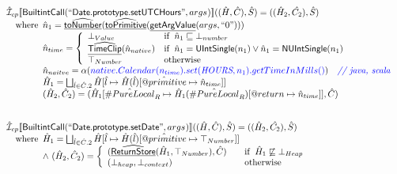 \documentclass{article}
\makeatletter
\newcommand{\SF}[1]{\mbox{\textsf{#1}}}
\newcommand{\comment}[1]{\textit{#1}}
\newcommand{\wherec}[1]{{\rm where}\begin{array}[t]{l}#1\end{array}}
\newcommand{\ifc}[1]{{\rm if}\begin{array}[t]{l}#1\end{array}}
\newcommand{\owc}{{\rm otherwise}}
\newcommand{\aI}{\hat{\mathcal{I}}}
\newcommand{\lbr}{\llbracket}
\newcommand{\rbr}{\rrbracket}
\newcommand{\hf}[1]{\underline{\sf #1}}
\newcommand{\ahf}[1]{\widehat{\underline{\sf #1}}}
\newcommand{\varprop}[1]{@#1}
\newcommand{\avarloc}[1]{\hat{\##1}}
\newcommand{\avarprop}[1]{\hat{@#1}}
\def\inblue{\color{blue}}
\def\inblue{\color{blue}}
\makeatother
\begin{document}
\[
\begin{array}{l}
\aI _{cp}\lbr \SF{BuiltintCall}(``\SF{Date.prototype.setUTCHours}",args_{})\rbr((\hat{H},\hat{C}), \hat{S})
  = ((\hat{H}_2, \hat{C_2}), \hat{S})\\
\quad\wherec{
  \hat{n}_{1} = \ahf{toNumber}(\ahf{toPrimitive}(\hf{getArgValue}(args, ``0")))\\
  \hat{n}_{time} = \left\{\begin{array}{ll}
      \bot_{Value} & \ifc{\hat{n}_{1} \sqsubseteq  \bot_{number}}\\
      \ahf{TimeClip}(\hat{n}_{native})
      & \ifc{\hat{n}_{1} = \SF{UIntSingle}(n_{1}) \lor \hat{n}_{1} = \SF{NUIntSingle}(n_{1}) }\\
      \top_{Number} & \owc
    \end{array}\right.\\
  \hat{n}_{naitve} = \alpha({\inblue native.Calendar(n_{time}).set(\emph{HOURS}, n_{1}).getTimeInMills()})
    \quad\comment{{\inblue // java, scala}}\\  
  \hat{H}_1 = \bigsqcup_{\hat{l} \in \hat{C}.2} \hat{H}[\hat{l}
    \mapsto \hat{H}(\hat{l})[\avarprop{primitive} \mapsto \hat{n}_{time}]]\\
  (\hat{H}_2, \hat{C}_2) = 
    (\hat{H}_1[\avarloc{PureLocal}_R \mapsto \hat{H}_1(\avarloc{PureLocal}_R)
      [\varprop{return} \mapsto \hat{n}_{time}]], \hat{C})\\
  }\\
\\\\

\aI _{cp}\lbr \SF{BuiltintCall}(``\SF{Date.prototype.setDate}",args_{})\rbr((\hat{H},\hat{C}), \hat{S})
  = ((\hat{H}_2, \hat{C_2}), \hat{S})\\
\quad\wherec{
  \hat{H}_1 = \bigsqcup_{\hat{l} \in \hat{C}.2} \hat{H}[\hat{l}
    \mapsto \hat{H}(\hat{l})[\avarprop{primitive} \mapsto \top_{Number}]]\\
  \land\ (\hat{H}_2, \hat{C}_2) = 
    \left\{\begin{array}{l@{\quad\quad}l}
      (\ahf{ReturnStore}(\hat{H}_1, \top_{Number}), \hat{C})
      & \ifc{\hat{H}_1 \not\sqsubseteq \bot_{Heap}}\\
      (\bot_{heap}, \bot_{context}) & \owc \\
    \end{array}\right.\\
  }\\
\\\\



\end{array}\]
\end{document}
